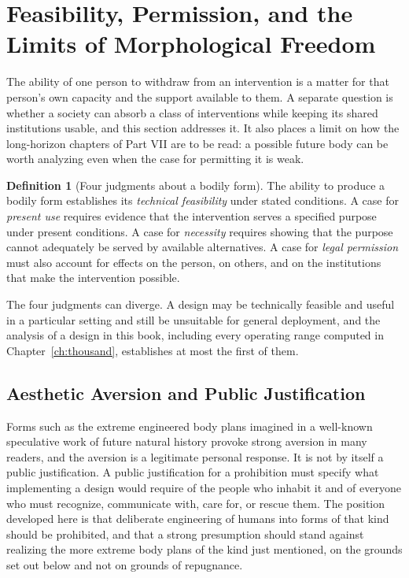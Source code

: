 \documentclass[11pt,openany]{book}
\theoremstyle{definition}
\newtheorem{definition}{Definition}[chapter]
\theoremstyle{remark}
\begin{document}
\section{Feasibility, Permission, and the Limits of Morphological Freedom}
\label{sec:permission}

The ability of one person to withdraw from an intervention is a matter for that person's own capacity and the support available to them. A separate question is whether a society can absorb a class of interventions while keeping its shared institutions usable, and this section addresses it. It also places a limit on how the long-horizon chapters of Part VII are to be read: a possible future body can be worth analyzing even when the case for permitting it is weak.

\begin{definition}[Four judgments about a bodily form]
\label{def:fourjudgments}
The ability to produce a bodily form establishes its \emph{technical feasibility} under stated conditions. A case for \emph{present use} requires evidence that the intervention serves a specified purpose under present conditions. A case for \emph{necessity} requires showing that the purpose cannot adequately be served by available alternatives. A case for \emph{legal permission} must also account for effects on the person, on others, and on the institutions that make the intervention possible.
\end{definition}

The four judgments can diverge. A design may be technically feasible and useful in a particular setting and still be unsuitable for general deployment, and the analysis of a design in this book, including every operating range computed in Chapter~\ref{ch:thousand}, establishes at most the first of them.

\subsection*{Aesthetic Aversion and Public Justification}

Forms such as the extreme engineered body plans imagined in a well-known speculative work of future natural history \cite{dixon1990} provoke strong aversion in many readers, and the aversion is a legitimate personal response. It is not by itself a public justification. A public justification for a prohibition must specify what implementing a design would require of the people who inhabit it and of everyone who must recognize, communicate with, care for, or rescue them. The position developed here is that deliberate engineering of humans into forms of that kind should be prohibited, and that a strong presumption should stand against realizing the more extreme body plans of the kind just mentioned, on the grounds set out below and not on grounds of repugnance.
\end{document}
